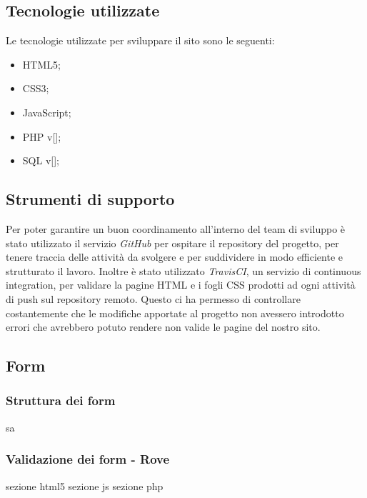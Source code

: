 \documentclass[12pt]{article}
\begin{document}
	\subsection{Tecnologie utilizzate}
	Le tecnologie utilizzate per sviluppare il sito sono le seguenti:
	\begin{itemize}
		\item HTML5;
		\item CSS3;
		\item JavaScript;
		\item PHP v[];
		\item SQL v[];
	\end{itemize}
	\subsection{Strumenti di supporto}
	Per poter garantire un buon coordinamento all'interno del team di sviluppo è stato utilizzato il servizio \emph{GitHub} per ospitare il repository del progetto, per tenere traccia delle attività da svolgere e per suddividere in modo efficiente e strutturato il lavoro. Inoltre è stato utilizzato \emph{TravisCI}, un servizio di continuous integration, per validare la pagine HTML e i fogli CSS prodotti ad ogni attività di push sul repository remoto. Questo ci ha permesso di controllare costantemente che le modifiche apportate al progetto non avessero introdotto errori che avrebbero potuto rendere non valide le pagine del nostro sito.
	\subsection{Form}
	\subsubsection{Struttura dei form}
	sa
	\subsubsection{Validazione dei form - Rove}
	sezione html5
	sezione js
	sezione php
\end{document}
